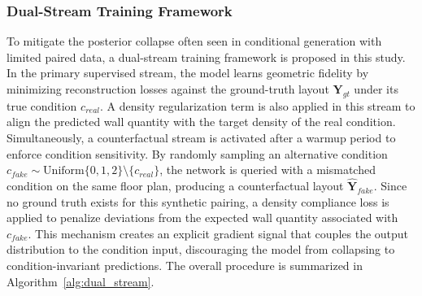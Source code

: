 \subsubsection{Dual-Stream Training Framework}

To mitigate the posterior collapse often seen in conditional generation with limited paired data, a dual-stream training framework is proposed in this study. In the primary supervised stream, the model learns geometric fidelity by minimizing reconstruction losses against the ground-truth layout $\mathbf{Y}_{gt}$ under its true condition $c_{real}$. A density regularization term is also applied in this stream to align the predicted wall quantity with the target density of the real condition. Simultaneously, a counterfactual stream is activated after a warmup period to enforce condition sensitivity. By randomly sampling an alternative condition $c_{fake} \sim \text{Uniform}\{0,1,2\} \setminus \{c_{real}\}$, the network is queried with a mismatched condition on the same floor plan, producing a counterfactual layout $\hat{\mathbf{Y}}_{fake}$. Since no ground truth exists for this synthetic pairing, a density compliance loss is applied to penalize deviations from the expected wall quantity associated with $c_{fake}$. This mechanism creates an explicit gradient signal that couples the output distribution to the condition input, discouraging the model from collapsing to condition-invariant predictions. The overall procedure is summarized in Algorithm~\ref{alg:dual_stream}.


